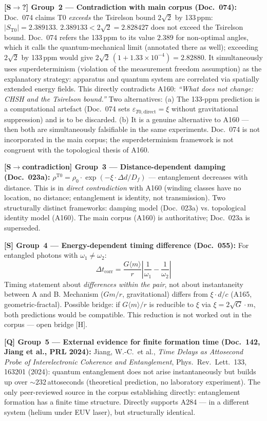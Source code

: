 \textbf{[S$\to$?] Group~2 --- Contradiction with main corpus (Doc.~074):}
Doc.~074 claims T0 \emph{exceeds} the Tsirelson bound $2\sqrt{2}$ by
133\,ppm: $|S_{\mathrm{T0}}| = 2{.}389133$. $2.389133 < 2\sqrt2 = 2.828427$ does not exceed the Tsirelson bound. Doc.~074 refers the 133\,ppm to its value $2.389$ for non-optimal angles, which it calls the quantum-mechanical limit (annotated there as well); exceeding $2\sqrt2$ by 133\,ppm would give $2\sqrt2\,(1+1.33\times10^{-4}) = 2.82880$.
It simultaneously uses superdeterminism (violation of the measurement freedom
assumption) as the explanatory strategy: apparatus and quantum system are
correlated via spatially extended energy fields.
This directly contradicts A160: \emph{``What does not change: CHSH and the
Tsirelson bound.''} Two alternatives:
(a) The 133-ppm prediction is a computational artefact (Doc.~074 sets
$\varepsilon_{T0,\text{direct}} = \xi$ without gravitational suppression)
and is to be discarded.
(b) It is a genuine alternative to A160 --- then both are simultaneously
falsifiable in the same experiments.
Doc.~074 is not incorporated in the main corpus; the superdeterminism
framework is not congruent with the topological thesis of A160.

\textbf{[S$\to$contradiction] Group~3 --- Distance-dependent damping
(Doc.~023a):}
$\rho^{\mathrm{T0}} = \rho_0\cdot\exp(-\xi\cdot\Delta d/D_f)$ ---
entanglement decreases with distance.
This is in \emph{direct contradiction} with A160 (winding classes have no
location, no distance; entanglement is identity, not transmission).
Two structurally distinct frameworks: damping model (Doc.~023a) vs.
topological identity model (A160).
The main corpus (A160) is authoritative; Doc.~023a is superseded.

\textbf{[S] Group~4 --- Energy-dependent timing difference (Doc.~055):}
For entangled photons with $\omega_1 \ne \omega_2$:
\[
  \Delta t_{\mathrm{corr}} = \frac{G\langle m\rangle}{r}
  \left|\frac{1}{\omega_1} - \frac{1}{\omega_2}\right|
\]
Timing statement about \emph{differences within the pair}, not about
instantaneity between A and B. Mechanism ($Gm/r$, gravitational) differs
from $\xi\cdot d/c$ (A165, geometric-fractal).
Possible bridge: if $G\langle m\rangle/r$ is reducible to $\xi$ via
$\xi = 2\sqrt{G}\cdot m$, both predictions would be compatible.
This reduction is not worked out in the corpus --- open bridge [H].

\textbf{[Q] Group~5 --- External evidence for finite formation time
(Doc.~142, Jiang et al., PRL 2024):}
Jiang, W.-C.~et al., \emph{Time Delays as Attosecond Probe of
Interelectronic Coherence and Entanglement},
Phys.\ Rev.\ Lett.\ 133, 163201 (2024):
quantum entanglement does not arise instantaneously but builds up over
$\sim 232$\,attoseconds (theoretical prediction, no laboratory experiment).
The only peer-reviewed source in the corpus establishing directly:
entanglement formation has a finite time structure. Directly supports A284
--- in a different system (helium under EUV laser), but structurally identical.

